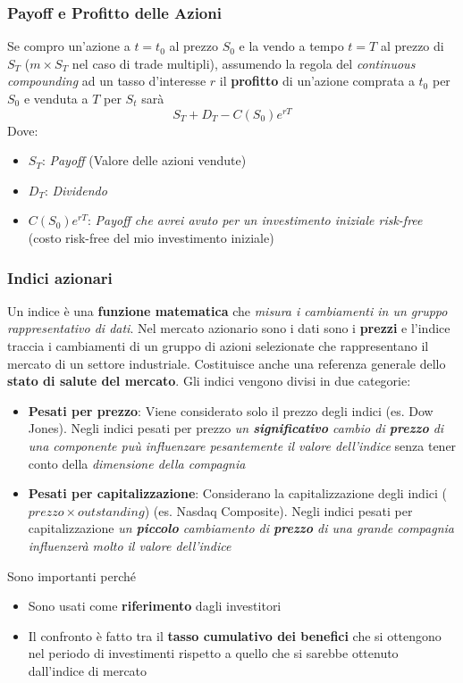 \documentclass[12pt]{article}
\begin{document}
\subsubsection{Payoff e Profitto delle Azioni}
Se compro un'azione a $t=t_0$ al prezzo $S_0$ e la vendo a tempo $t=T$ al prezzo di $S_T$ ($m\times S_T$ nel caso di trade multipli), assumendo la regola del \textit{continuous compounding} ad un tasso d'interesse $r$ il \textbf{profitto} di un'azione comprata a $t_0$ per $S_0$ e venduta a $T$ per $S_t$ sarà
$$S_T + D_T - C(S_0)e^{rT}$$
Dove:
\begin{itemize}[label=]
    \item $S_T$: \textit{Payoff} (Valore delle azioni vendute)
    \item $D_T$: \textit{Dividendo}
    \item $C(S_0)e^{rT}$: \textit{Payoff che avrei avuto per un investimento iniziale risk-free} (costo risk-free del mio investimento iniziale)
\end{itemize}
\subsubsection{Indici azionari}
Un indice è una \textbf{funzione matematica} che \textit{misura i cambiamenti in un gruppo rappresentativo di dati}. Nel mercato azionario sono i dati sono i \textbf{prezzi} e l'indice traccia i cambiamenti di un gruppo di azioni selezionate che rappresentano il mercato di un settore industriale. Costituisce anche una referenza generale dello \textbf{stato di salute del mercato}. Gli indici vengono divisi in due categorie:
\begin{itemize}
    \item \textbf{Pesati per prezzo}: Viene considerato solo il prezzo degli indici (es. Dow Jones). Negli indici pesati per prezzo \textit{un \textbf{significativo} cambio di \textbf{prezzo} di una componente puù influenzare pesantemente il valore dell'indice} senza tener conto della \textit{dimensione della compagnia}
    \item \textbf{Pesati per capitalizzazione}: Considerano la capitalizzazione degli indici ($prezzo \times outstanding$) (es. Nasdaq Composite). Negli indici pesati per capitalizzazione \textit{un \textbf{piccolo} cambiamento di \textbf{prezzo} di una grande compagnia influenzerà molto il valore dell'indice}
\end{itemize}
Sono importanti perché\begin{itemize}
    \item Sono usati come \textbf{riferimento} dagli investitori
    \item Il confronto è fatto tra il \textbf{tasso cumulativo dei benefici} che si ottengono nel periodo di investimenti rispetto a quello che si sarebbe ottenuto dall'indice di mercato
\end{itemize}
\end{document}
